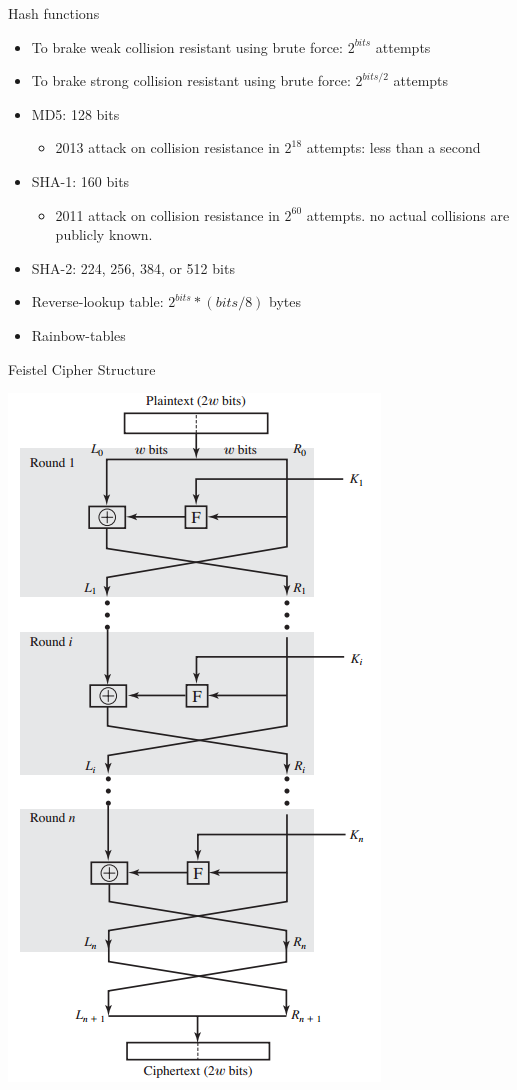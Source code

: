 \documentclass{beamer}
\begin{document}
\begin{frame}{Hash functions}
  \begin{itemize}
  \item To brake weak collision resistant using brute force: $2^{bits}$ attempts
  \item To brake strong collision resistant using brute force: $2^{bits/2}$ attempts
  \item MD5: 128 bits
    \begin{itemize}
      \item 2013 attack on collision resistance in $2^{18}$ attempts: less than a second
    \end{itemize}
  \item SHA-1: 160 bits
    \begin{itemize}
      \item 2011 attack on collision resistance in $2^{60}$
        attempts. no actual collisions are publicly known. 
    \end{itemize}
  \item SHA-2: 224, 256, 384, or 512 bits
  \item Reverse-lookup table: $2^{bits}*(bits/8)$ bytes
  \item Rainbow-tables
  \end{itemize}
\end{frame}

\begin{frame}{Feistel Cipher Structure}
  \begin{center}
    \includegraphics[width=0.35\linewidth]{Feistel}
  \end{center}
\end{frame}
\end{document}
